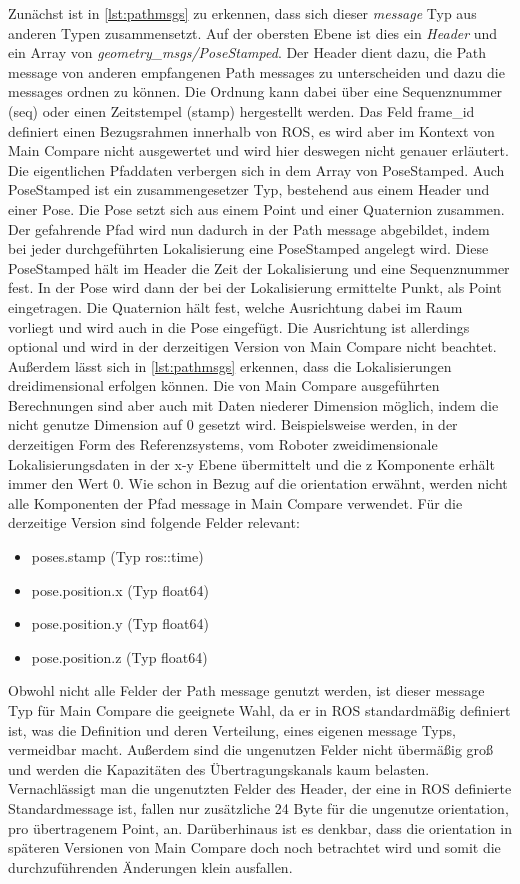 Zunächst ist in \autoref{lst:pathmsgs} zu erkennen, dass sich dieser \textit{message} Typ aus anderen Typen
zusammensetzt. Auf der obersten Ebene ist dies ein
\textit{Header} und ein Array von \textit{geometry\_msgs/PoseStamped}.
Der Header dient dazu, die Path message von anderen empfangenen
Path messages zu unterscheiden und dazu die messages ordnen zu können. Die Ordnung kann dabei über eine Sequenznummer
(seq) oder einen Zeitstempel (stamp) hergestellt werden. Das Feld frame\_id
definiert einen Bezugsrahmen innerhalb von ROS, es wird aber im Kontext von
Main Compare nicht ausgewertet und wird hier deswegen nicht genauer erläutert.
Die eigentlichen Pfaddaten verbergen sich in dem Array von PoseStamped. Auch
PoseStamped ist ein zusammengesetzer Typ, bestehend aus einem Header und einer
Pose. Die Pose setzt sich aus einem Point und einer Quaternion zusammen.
Der gefahrende Pfad wird nun dadurch in der Path message abgebildet, indem bei
jeder durchgeführten Lokalisierung eine PoseStamped angelegt wird. Diese PoseStamped
hält im Header die Zeit der Lokalisierung und eine Sequenznummer fest. In der
Pose wird dann der bei der Lokalisierung ermittelte Punkt, als Point eingetragen. Die Quaternion
hält fest, welche Ausrichtung dabei im Raum vorliegt und wird auch
in die Pose eingefügt. Die Ausrichtung ist
allerdings optional und wird in der derzeitigen Version von Main Compare nicht beachtet. 
Außerdem lässt sich in \autoref{lst:pathmsgs} erkennen, dass die
Lokalisierungen dreidimensional erfolgen können. Die von Main Compare
ausgeführten Berechnungen sind aber auch mit Daten niederer Dimension möglich,
indem die nicht genutze Dimension auf 0 gesetzt wird. Beispielsweise werden,
in der derzeitigen Form des Referenzsystems, vom Roboter zweidimensionale
Lokalisierungsdaten in der x-y Ebene übermittelt und die z Komponente erhält
immer den Wert 0. Wie schon in Bezug auf die orientation erwähnt, werden nicht alle Komponenten der
Pfad message in Main Compare verwendet. Für die derzeitige Version sind
folgende Felder relevant:

\begin{itemize}
  \item poses.stamp (Typ ros::time)
  \item pose.position.x (Typ float64)
  \item pose.position.y (Typ float64)
  \item pose.position.z (Typ float64)
\end{itemize}

Obwohl nicht alle Felder der Path message genutzt werden, ist dieser message Typ
für Main Compare die geeignete Wahl, da er in ROS standardmäßig
definiert ist, was die Definition und deren Verteilung, eines
eigenen message Typs, vermeidbar macht. Außerdem sind die ungenutzen Felder nicht
übermäßig groß und werden die Kapazitäten des Übertragungskanals kaum belasten.
Vernachlässigt man die ungenutzten Felder des Header, der eine in ROS definierte Standardmessage ist, fallen nur
zusätzliche 24 Byte für die ungenutze orientation, pro übertragenem Point, an.
Darüberhinaus ist es denkbar, dass die orientation in späteren Versionen von
Main Compare doch noch betrachtet wird und somit die durchzuführenden
Änderungen klein ausfallen.

